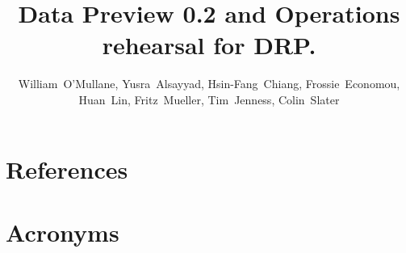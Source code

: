 \documentclass[OPS,lsstdraft,authoryear,toc]{lsstdoc}
\title{Data Preview 0.2 and Operations rehearsal for DRP.}
\author{%
William~O'Mullane,
Yusra~Alsayyad,
Hsin-Fang~Chiang,
Frossie~Economou,
Huan~Lin,
Fritz~Mueller,
Tim~Jenness,
Colin~Slater
}
\date{\vcsDate}
\begin{document}
\maketitle


\appendix
\section{References} \label{sec:bib}
\renewcommand{\refname}{} %


\section{Acronyms} \label{sec:acronyms}

\end{document}
